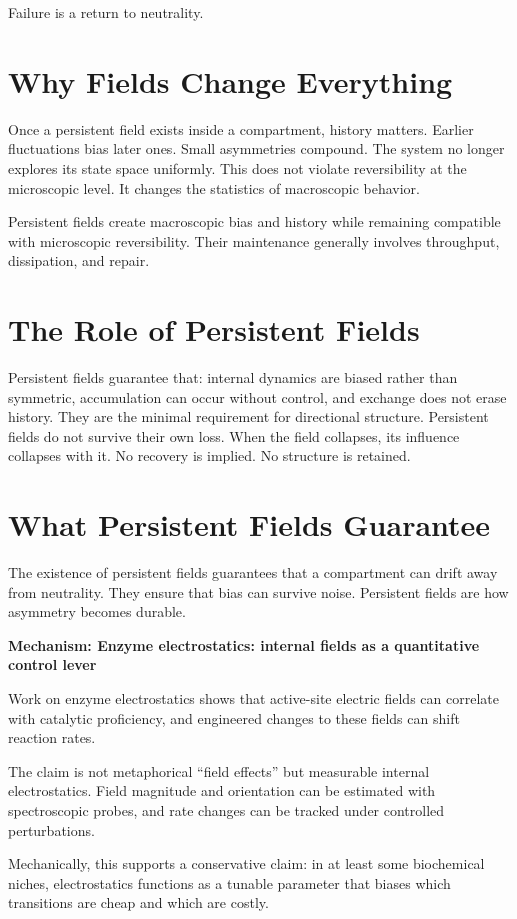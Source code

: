 \documentclass[11pt,twoside,openright]{book}
\newenvironment{mechanismbox}[1]
  {\begin{framed}\noindent\textbf{Mechanism: #1}\par\medskip}
  {\end{framed}}
\begin{document}
Failure is a return to neutrality.

\section*{Why Fields Change Everything}

Once a persistent field exists inside a compartment, history matters. Earlier fluctuations bias later ones. Small asymmetries compound. The system no longer explores its state space uniformly. This does not violate reversibility at the microscopic level. It changes the statistics of macroscopic behavior.

Persistent fields create macroscopic bias and history while remaining compatible with microscopic reversibility. Their maintenance generally involves throughput, dissipation, and repair.

\section*{The Role of Persistent Fields}

Persistent fields guarantee that: internal dynamics are biased rather than symmetric, accumulation can occur without control, and exchange does not erase history. They are the minimal requirement for directional structure. Persistent fields do not survive their own loss. When the field collapses, its influence collapses with it. No recovery is implied. No structure is retained.

\section*{What Persistent Fields Guarantee}

The existence of persistent fields guarantees that a compartment can drift away from neutrality. They ensure that bias can survive noise. Persistent fields are how asymmetry becomes durable.

\begin{mechanismbox}{Enzyme electrostatics: internal fields as a quantitative control lever}
Work on enzyme electrostatics shows that active-site electric fields can correlate with catalytic proficiency, and engineered changes to these fields can shift reaction rates.

The claim is not metaphorical ``field effects'' but measurable internal electrostatics. Field magnitude and orientation can be estimated with spectroscopic probes, and rate changes can be tracked under controlled perturbations.

Mechanically, this supports a conservative claim: in at least some biochemical niches, electrostatics functions as a tunable parameter that biases which transitions are cheap and which are costly.
\end{mechanismbox}
\end{document}
